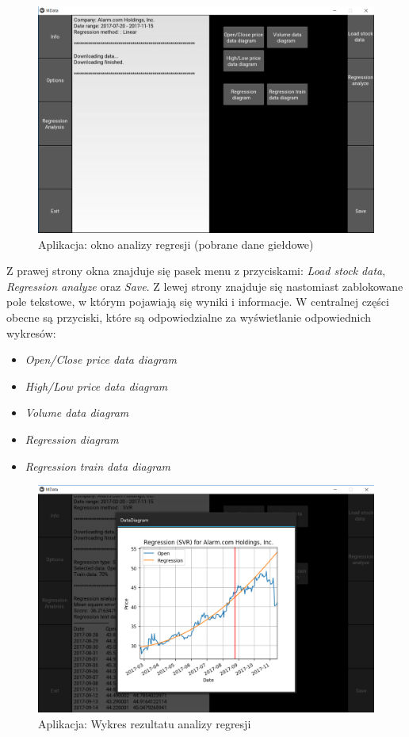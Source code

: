 \begin{figure}[h!]
\centering
\includegraphics[width=150mm]{pictures/app_reg_screen_data_loaded.png}
\caption{Aplikacja: okno analizy regresji (pobrane dane giełdowe)}
\label{fig:Okno analizy regresji}
\end{figure}

Z prawej strony okna znajduje się pasek menu z przyciskami: \textit{Load stock data}, \textit{Regression analyze} oraz \textit{Save}.
Z lewej strony znajduje się nastomiast zablokowane pole tekstowe, w którym pojawiają się wyniki i informacje.
W centralnej części obecne są przyciski, które są odpowiedzialne za wyświetlanie odpowiednich wykresów:
\begin{itemize}
 \item \textit{Open/Close price data diagram}
 \item \textit{High/Low price data diagram}
 \item \textit{Volume data diagram}
 \item \textit{Regression diagram}
 \item \textit{Regression train data diagram}
\end{itemize}

\begin{figure}[h!]
\centering
\includegraphics[width=150mm]{pictures/app_reg_screen_plot.png}
\caption{Aplikacja: Wykres rezultatu analizy regresji}
\label{fig:Wykres rezultatu analizy regresji}
\end{figure}

